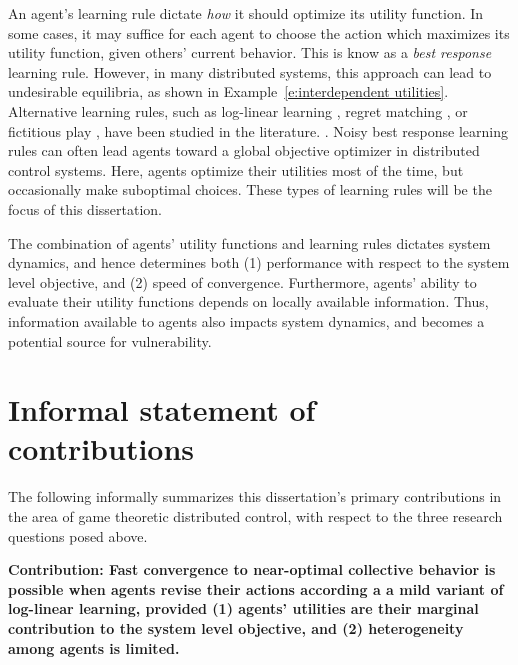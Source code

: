 An agent's learning rule dictate {\it how} it should optimize its utility function. In some cases, it may suffice for each agent to choose the action which maximizes its utility function, given others' current behavior. This is know as a {\it best response} learning rule. However, in many distributed systems, this approach can lead to undesirable equilibria, as shown in Example~\ref{e:interdependent utilities}. Alternative learning rules, such as log-linear learning \cite{Blume1993}, regret matching \cite{blah}, or fictitious play \cite{blah}, have been studied in the literature. . Noisy best response learning rules can often lead agents toward a global objective optimizer in distributed control systems. Here, agents optimize their utilities most of the time, but occasionally make suboptimal choices. These types of learning rules will be the focus of this dissertation.

The combination of agents' utility functions and learning rules dictates system dynamics, and hence determines both (1) performance with respect to the system level objective, and (2) speed of convergence. Furthermore, agents' ability to evaluate their utility functions depends on locally available information. Thus, information available to agents also impacts system dynamics, and becomes a potential source for vulnerability.



\section{Informal statement of contributions}


The following informally summarizes this dissertation's primary contributions in the area of game theoretic distributed control, with respect to the three research questions posed above.


\smallskip

\noindent \textbf{Contribution: Fast convergence to near-optimal collective behavior is possible when agents revise their actions according a a mild variant of log-linear learning, provided (1) agents' utilities are their marginal contribution to the system level objective, and (2) heterogeneity among agents is limited.}


